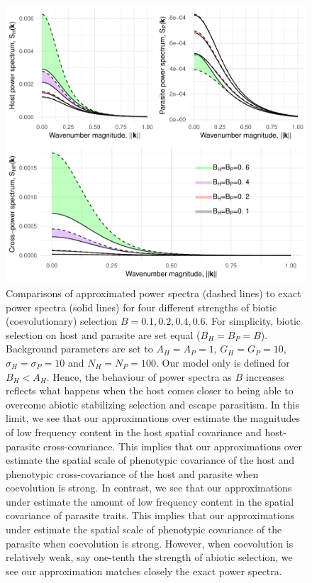 \documentclass{article}
\begin{document}
\begin{figure}
\centering
\includegraphics{Spatial-Scales-of-Local-Adaptation-in-Host-Parasite-Coevolution_files/figure-latex/unnamed-chunk-1-1.pdf}
\caption{Comparisons of approximated power spectra (dashed lines) to
exact power spectra (solid lines) for four different strengths of biotic
(coevolutionary) selection \(B=0.1,0.2,0.4,0.6\). For simplicity, biotic
selection on host and parasite are set equal (\(B_H=B_P=B\)). Background
parameters are set to \(A_H=A_P=1\), \(G_H=G_P=10\),
\(\sigma_H=\sigma_P=10\) and \(N_H=N_P=100\). Our model only is defined
for \(B_H<A_H\). Hence, the behaviour of power spectra as \(B\)
increases reflects what happens when the host comes closer to being able
to overcome abiotic stabilizing selection and escape parasitism. In this
limit, we see that our approximations over estimate the magnitudes of
low frequency content in the host spatial covariance and host-parasite
cross-covariance. This implies that our approximations over estimate the
spatial scale of phenotypic covariance of the host and phenotypic
cross-covariance of the host and parasite when coevolution is strong. In
contrast, we see that our approximations under estimate the amount of
low frequency content in the spatial covariance of parasite traits. This
implies that our approximations under estimate the spatial scale of
phenotypic covariance of the parasite when coevolution is strong.
However, when coevolution is relatively weak, say one-tenth the strength
of abiotic selection, we see our approximation matches closely the exact
power spectra.}
\end{figure}
\end{document}
